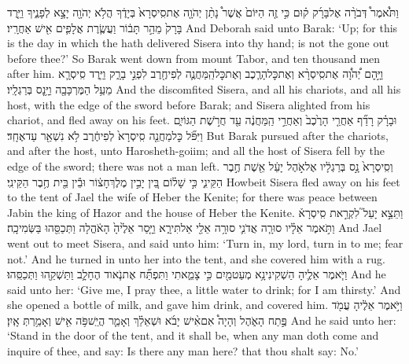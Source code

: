 {וַתֹּ֩אמֶר֩ דְּבֹרָ֨ה אֶל\maqqaf בָּרָ֜ק ק֗וּם כִּ֣י זֶ֤ה הַיּוֹם֙ אֲשֶׁר֩ נָתַ֨ן יְהֹוָ֤ה אֶת\maqqaf סִֽיסְרָא֙ בְּיָדֶ֔ךָ הֲלֹ֥א יְהֹוָ֖ה יָצָ֣א לְפָנֶ֑יךָ וַיֵּ֤רֶד בָּרָק֙ מֵהַ֣ר תָּב֔וֹר וַעֲשֶׂ֧רֶת אֲלָפִ֛ים אִ֖ישׁ אַחֲרָֽיו׃}
{And Deborah said unto Barak: ‘Up; for this is the day in which the \lord\space hath delivered Sisera into thy hand; is not the \lord\space gone out before thee?’ So Barak went down from mount Tabor, and ten thousand men after him.}
{וַיָּ֣הׇם יְ֠הֹוָ֠ה אֶת\maqqaf סִֽיסְרָ֨א וְאֶת\maqqaf כׇּל\maqqaf הָרֶ֧כֶב וְאֶת\maqqaf כׇּל\maqqaf הַֽמַּחֲנֶ֛ה לְפִי\maqqaf חֶ֖רֶב לִפְנֵ֣י בָרָ֑ק וַיֵּ֧רֶד סִֽיסְרָ֛א מֵעַ֥ל הַמֶּרְכָּבָ֖ה וַיָּ֥נׇס בְּרַגְלָֽיו׃}
{And the \lord\space discomfited Sisera, and all his chariots, and all his host, with the edge of the sword before Barak; and Sisera alighted from his chariot, and fled away on his feet.}
{וּבָרָ֗ק רָדַ֞ף אַחֲרֵ֤י הָרֶ֙כֶב֙ וְאַחֲרֵ֣י הַֽמַּחֲנֶ֔ה עַ֖ד חֲרֹ֣שֶׁת הַגּוֹיִ֑ם וַיִּפֹּ֞ל כׇּל\maqqaf מַחֲנֵ֤ה סִֽיסְרָא֙ לְפִי\maqqaf חֶ֔רֶב לֹ֥א נִשְׁאַ֖ר עַד\maqqaf אֶחָֽד׃}
{But Barak pursued after the chariots, and after the host, unto Harosheth-goiim; and all the host of Sisera fell by the edge of the sword; there was not a man left.}
{וְסִֽיסְרָא֙ נָ֣ס בְּרַגְלָ֔יו אֶל\maqqaf אֹ֣הֶל יָעֵ֔ל אֵ֖שֶׁת חֶ֣בֶר הַקֵּינִ֑י כִּ֣י שָׁל֗וֹם בֵּ֚ין יָבִ֣ין מֶלֶךְ\maqqaf חָצ֔וֹר וּבֵ֕ין בֵּ֖ית חֶ֥בֶר הַקֵּינִֽי׃}
{Howbeit Sisera fled away on his feet to the tent of Jael the wife of Heber the Kenite; for there was peace between Jabin the king of Hazor and the house of Heber the Kenite.}
{וַתֵּצֵ֣א יָעֵל֮ לִקְרַ֣את סִֽיסְרָא֒ וַתֹּ֣אמֶר אֵלָ֗יו סוּרָ֧ה אֲדֹנִ֛י סוּרָ֥ה אֵלַ֖י אַל\maqqaf תִּירָ֑א וַיָּ֤סַר אֵלֶ֙יהָ֙ הָאֹ֔הֱלָה וַתְּכַסֵּ֖הוּ בַּשְּׂמִיכָֽה׃}
{And Jael went out to meet Sisera, and said unto him: ‘Turn in, my lord, turn in to me; fear not.’ And he turned in unto her into the tent, and she covered him with a rug.}
{וַיֹּ֧אמֶר אֵלֶ֛יהָ הַשְׁקִינִי\maqqaf נָ֥א מְעַט\maqqaf מַ֖יִם כִּ֣י צָמֵ֑אתִי וַתִּפְתַּ֞ח אֶת\maqqaf נֹ֧אוד הֶחָלָ֛ב וַתַּשְׁקֵ֖הוּ וַתְּכַסֵּֽהוּ׃}
{And he said unto her: ‘Give me, I pray thee, a little water to drink; for I am thirsty.’ And she opened a bottle of milk, and gave him drink, and covered him.}
{וַיֹּ֣אמֶר אֵלֶ֔יהָ עֲמֹ֖ד פֶּ֣תַח הָאֹ֑הֶל וְהָיָה֩ אִם\maqqaf אִ֨ישׁ יָבֹ֜א וּשְׁאֵלֵ֗ךְ וְאָמַ֛ר הֲיֵֽשׁ\maqqaf פֹּ֥ה אִ֖ישׁ וְאָמַ֥רְתְּ אָֽיִן׃}
{And he said unto her: ‘Stand in the door of the tent, and it shall be, when any man doth come and inquire of thee, and say: Is there any man here? that thou shalt say: No.’}
